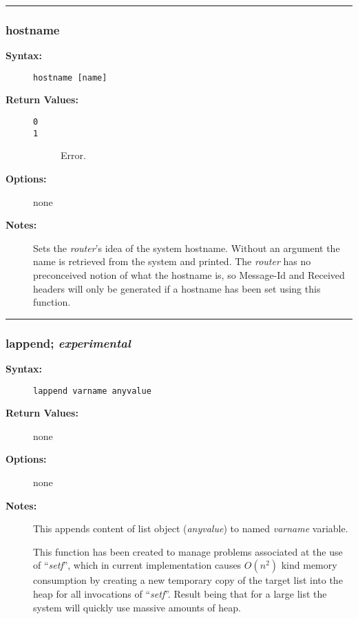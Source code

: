 \hrule
\subsubsection{hostname}

\begin{description}
\item[{\bf Syntax:}] \mbox{}

{\tt hostname [name]}

\item[{\bf Return Values:}] \mbox{}

\begin{description}
\item[{\tt 0}] \mbox{}



\item[{\tt 1}] \mbox{}

Error.

\end{description}


\item[{\bf Options:}] \mbox{}

none  

\item[{\bf Notes:}] \mbox{}

Sets the {\em router}'s idea of the
system hostname. Without an argument the name is retrieved from
the system and printed. The {\em router} has no preconceived 
notion of what the hostname is, so Message-Id and Received headers 
will only be generated if a hostname has been set using this function.

\end{description}


\hrule
\subsubsection{lappend; \em experimental}

\begin{description}
\item[{\bf Syntax:}] \mbox{}

{\tt lappend varname anyvalue}

\item[{\bf Return Values:}] \mbox{}

none

\item[{\bf Options:}] \mbox{}

none  

\item[{\bf Notes:}] \mbox{}

This appends content of list object ({\em anyvalue}) to named
{\em varname} variable.

This function has been created to manage problems associated
at the use of ``{\em setf}'', which in current implementation
causes $O(n^{2})$ kind memory consumption by creating a new
temporary copy of the target list into the heap for all invocations
of ``{\em setf}''.  Result being that for a large list the system
will quickly use massive amounts of heap.

\end{description}

